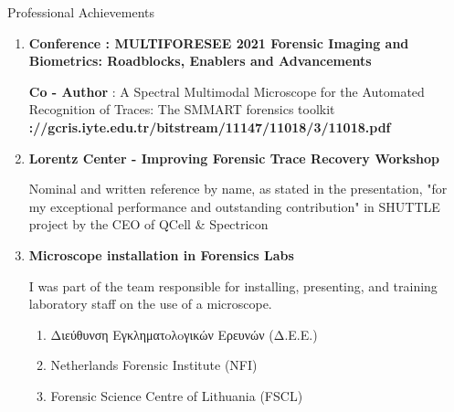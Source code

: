 \documentclass{resume} %
\begin{document}
\newpage
\begin{rSection}{Professional Achievements}
    \vspace*{1\baselineskip}
    \begin{enumerate}[label=\textbullet]
        \item \textbf{Conference : MULTIFORESEE 2021 Forensic Imaging and Biometrics: Roadblocks, Enablers and Advancements}\par
              \textbf{Co - Author} : A Spectral Multimodal Microscope for the Automated Recognition of Traces: The SMMART forensics toolkit  \parhttps\textbf{://gcris.iyte.edu.tr/bitstream/11147/11018/3/11018.pdf}\par 
          
    \vspace*{1\baselineskip}
    \item \textbf{Lorentz Center - Improving Forensic Trace Recovery Workshop}\par
           Nominal and written reference by name, as stated in the presentation, "for my exceptional performance and outstanding contribution" in SHUTTLE project by the CEO of QCell \& Spectricon 
    \vspace*{1\baselineskip}
    \item \textbf{Microscope installation in Forensics Labs}\par
           I was part of the team responsible for installing, presenting, and training laboratory staff on the use of a microscope.
           \begin{enumerate}[label=\textbullet]
               \item  Διεύθυνση Εγκληματoλoγικών Ερευνών (Δ.Ε.Ε.)
               \item  Netherlands Forensic Institute (NFI)
               \item  Forensic Science Centre of Lithuania (FSCL)
           \end{enumerate}
    \end{enumerate}
    \vspace*{1\baselineskip}
\end{rSection}

\end{document}
